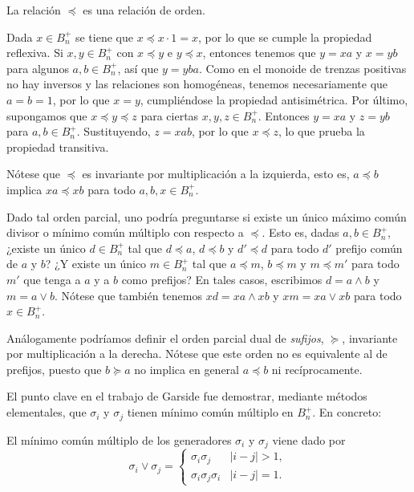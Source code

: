 \documentclass[TFG.tex]{subfiles}
\begin{document}
\begin{lemma}
La relación $\preccurlyeq$ es una relación de orden.
\end{lemma}
\begin{dem}
Dada $x\in B_n^+$ se tiene que $x\preccurlyeq x\cdot 1=x$, por lo que se cumple la propiedad reflexiva. Si $x,y\in B_n^+$ con $x \preccurlyeq y $ e $y \preccurlyeq x$, entonces tenemos que $y=xa$ y $x=yb$ para algunos $a,b\in B_n^+$, así que $y=yba$. Como en el monoide de trenzas positivas no hay inversos y las relaciones son homogéneas, tenemos necesariamente que $a=b=1$, por lo que $x=y$, cumpliéndose la propiedad antisimétrica. Por último, supongamos que $x\preccurlyeq y\preccurlyeq z$ para ciertas $x,y,z\in B_n^+$. Entonces $y=xa$ y $z=yb$ para $a,b\in B_n^+$. Sustituyendo, $z=xab$, por lo que $x\preccurlyeq z$, lo que prueba la propiedad transitiva. \QED
\end{dem}
Nótese que $\preccurlyeq$ es invariante por multiplicación a la izquierda, esto es, $a\preccurlyeq b$ implica $xa\preccurlyeq xb$ para todo $a,b,x\in B_n^+$. %

Dado tal orden parcial, uno podría preguntarse si existe un único máximo común divisor o mínimo común múltiplo con respecto a $\preccurlyeq$. Esto es, dadas $a,b\in B_n^+$, ¿existe un único $d\in B_n^+$ tal que $d\preccurlyeq a$, $d\preccurlyeq b$ y $d'\preccurlyeq d$ para todo $d'$ prefijo común de $a$ y $b$? ¿Y existe un único $m\in B_n^+$ tal que $a\preccurlyeq m$, $b\preccurlyeq m$ y $m\preccurlyeq m'$ para todo $m'$ que tenga a $a$ y a $b$ como prefijos? En tales casos, escribimos $d=a\land b$ y $m=a\lor b$. Nótese que también tenemos $xd=xa\land xb$ y $xm=xa\lor xb$ para todo $x\in B_n^+$.

\begin{nota}
Análogamente podríamos definir el orden parcial dual  de \emph{sufijos}, $\succcurlyeq$, invariante por multiplicación a la derecha. Nótese que este orden no es equivalente al de prefijos, puesto que $b\succcurlyeq a$ no implica en general $a\preccurlyeq b$ ni recíprocamente. 
\end{nota}

El punto clave en el trabajo de Garside fue demostrar, mediante métodos elementales, que $\sigma_i$ y $\sigma_j$ tienen mínimo común múltiplo en $B_n^+$. En concreto:
\begin{prop} 
El mínimo común múltiplo de los generadores $\sigma_i$ y $\sigma_j$ viene dado por
$$\sigma_i\lor\sigma_j=\begin{cases}
\sigma_i\sigma_j & |i-j|>1,\\
\sigma_i\sigma_j\sigma_i & |i-j|=1.
\end{cases}$$
\end{prop}
\end{document}
